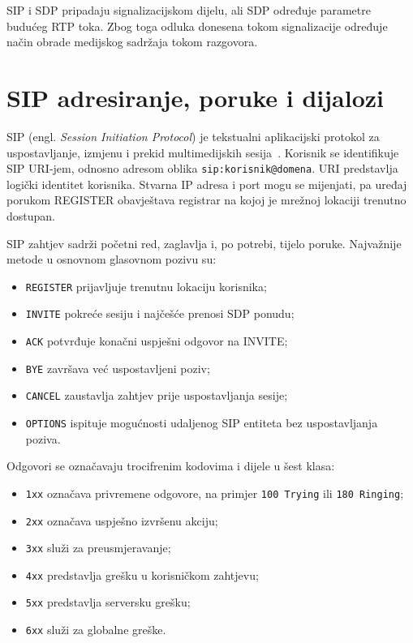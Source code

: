 \noindent SIP i SDP pripadaju signalizacijskom dijelu, ali SDP određuje parametre budućeg RTP toka. Zbog toga odluka donesena tokom signalizacije određuje način obrade medijskog sadržaja tokom razgovora.

\section{SIP adresiranje, poruke i dijalozi}

SIP (engl. \emph{Session Initiation Protocol}) je tekstualni aplikacijski protokol za uspostavljanje, izmjenu i prekid multimedijskih sesija~\cite{rfc3261}. Korisnik se identifikuje SIP URI-jem, odnosno adresom oblika \texttt{sip:korisnik@domena}. URI predstavlja logički identitet korisnika. Stvarna IP adresa i port mogu se mijenjati, pa uređaj porukom REGISTER obavještava registrar na kojoj je mrežnoj lokaciji trenutno dostupan.

SIP zahtjev sadrži početni red, zaglavlja i, po potrebi, tijelo poruke. Najvažnije metode u osnovnom glasovnom pozivu su:

\begin{itemize}
    \item \texttt{REGISTER} prijavljuje trenutnu lokaciju korisnika;
    \item \texttt{INVITE} pokreće sesiju i najčešće prenosi SDP ponudu;
    \item \texttt{ACK} potvrđuje konačni uspješni odgovor na INVITE;
    \item \texttt{BYE} završava već uspostavljeni poziv;
    \item \texttt{CANCEL} zaustavlja zahtjev prije uspostavljanja sesije;
    \item \texttt{OPTIONS} ispituje mogućnosti udaljenog SIP entiteta bez uspostavljanja poziva.
\end{itemize}

Odgovori se označavaju trocifrenim kodovima i dijele u šest klasa:

\begin{itemize}
    \item \texttt{1xx} označava privremene odgovore, na primjer \texttt{100 Trying} ili \texttt{180 Ringing};
    \item \texttt{2xx} označava uspješno izvršenu akciju;
    \item \texttt{3xx} služi za preusmjeravanje;
    \item \texttt{4xx} predstavlja grešku u korisničkom zahtjevu;
    \item \texttt{5xx} predstavlja serversku grešku;
    \item \texttt{6xx} služi za globalne greške.
\end{itemize}

